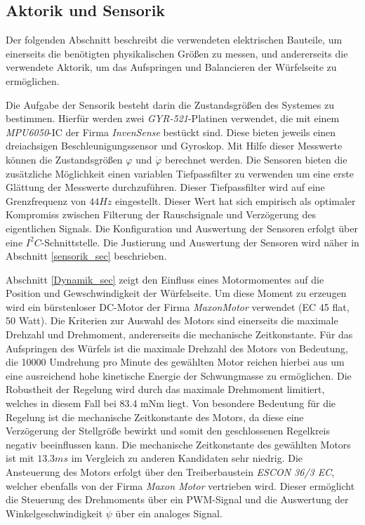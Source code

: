 \subsection{Aktorik und Sensorik}
Der folgenden Abschnitt beschreibt die verwendeten elektrischen Bauteile, um einerseits die benötigten physikalischen Größen zu messen, und andererseits die verwendete Aktorik, um das Aufspringen und Balancieren der Würfelseite zu ermöglichen.
\newline 

Die Aufgabe der Sensorik besteht darin die Zustandsgrößen des Systemes zu bestimmen. Hierfür werden zwei \textit{GYR-521}-Platinen verwendet, die mit einem \textit{MPU6050}-IC der Firma \textit{InvenSense} bestückt sind. Diese bieten jeweils einen dreiachsigen Beschleunigungssensor und Gyroskop. Mit Hilfe dieser Messwerte können die Zustandsgrößen $\varphi$ und $\dot{\varphi}$ berechnet werden. Die Sensoren bieten die zusätzliche Möglichkeit einen variablen Tiefpassfilter zu verwenden um eine erste Glättung der Messwerte durchzuführen. Dieser Tiefpassfilter wird auf eine Grenzfrequenz von $44Hz$ eingestellt. Dieser Wert hat sich empirisch als optimaler Kompromiss zwischen Filterung der Rauschsignale und Verzögerung des eigentlichen Signals. Die Konfiguration und Auswertung der Sensoren erfolgt über eine $I^2C$-Schnittstelle. Die Justierung und Auswertung der Sensoren wird näher in Abschnitt \ref{sensorik_sec} beschrieben.
\newline

Abschnitt \ref{Dynamik_sec} zeigt den Einfluss eines Motormomentes auf die Position und Gewschwindigkeit der Würfelseite. Um diese Moment zu erzeugen wird ein bürstenloser DC-Motor der Firma \textit{MaxonMotor} verwendet (EC 45 flat, 50 Watt). Die Kriterien zur Auswahl des Motors sind einerseits die maximale Drehzahl und Drehmoment, andererseits die mechanische Zeitkonstante. Für das Aufspringen des Würfels ist die maximale Drehzahl des Motors von Bedeutung, die 10000 Umdrehung pro Minute des gewählten Motor reichen hierbei aus um eine ausreichend hohe kinetische Energie der Schwungmasse zu ermöglichen. Die Robustheit der Regelung wird durch das maximale Drehmoment limitiert, welches in diesem Fall bei 83.4 mNm liegt. Von besondere Bedeutung für die Regelung ist die mechanische Zeitkonstante des Motors, da diese eine Verzögerung der Stellgröße bewirkt und somit den geschlossenen Regelkreis negativ beeinflussen kann. Die mechanische Zeitkonstante des gewählten Motors ist mit $13.3ms$ im Vergleich zu anderen Kandidaten sehr niedrig. Die Ansteuerung des Motors erfolgt über den Treiberbaustein \textit{ESCON 36/3 EC}, welcher ebenfalls von der Firma \textit{Maxon Motor} vertrieben wird. Dieser ermöglicht die Steuerung des Drehmoments über ein PWM-Signal und die Auswertung der Winkelgeschwindigkeit $\dot{\psi}$ über ein analoges Signal.
\newline


